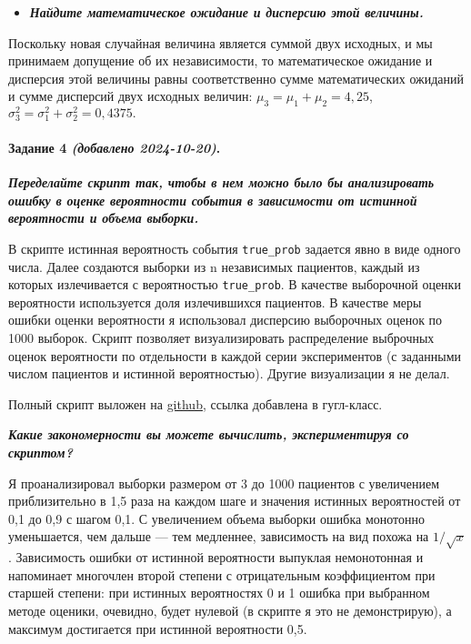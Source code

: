 \documentclass[12pt, a4paper]{article}
\providecommand{\tightlist}{%
  \setlength{\itemsep}{0pt}\setlength{\parskip}{0pt}}
\let\oldparagraph\paragraph
\renewcommand{\paragraph}[1]{\oldparagraph{#1}\mbox{}}
\begin{document}
\begin{itemize}
\tightlist
\item
  \textit{\textbf{Найдите математическое ожидание и дисперсию этой
  величины.}}
\end{itemize}

Поскольку новая случайная величина является суммой двух исходных, и мы принимаем допущение об их независимости, то математическое ожидание и дисперсия этой величины равны соответственно сумме математических ожиданий и сумме дисперсий двух исходных величин: \(\mu_3 = \mu_1+\mu_2 = 4,25\), 
\(\sigma^2_3 = \sigma^2_1 + \sigma^2_2 = 0,4375.\)


\paragraph{Задание 4 \textit{(добавлено 2024-10-20)}.}\label{-4.} 

\textit{\textbf{Переделайте скрипт так, чтобы в нем можно было бы анализировать ошибку в оценке вероятности события в зависимости от истинной вероятности и объема выборки.}}

В скрипте истинная вероятность события \verb|true_prob| задается явно в виде одного числа. Далее создаются выборки из n независимых пациентов, каждый из которых излечивается с вероятностью \verb|true_prob|. В качестве выборочной оценки вероятности используется доля излечившихся пациентов. В качестве меры ошибки оценки вероятности я использовал дисперсию выборочных оценок по 1000 выборок. Скрипт позволяет визуализировать распределение выброчных оценок вероятности по отдельности в каждой серии экспериментов (с заданными числом пациентов и истинной вероятностью). Другие визуализации я не делал.

Полный скрипт выложен на \href{https://github.com/ovtarasov/BioStat_2024/blob/main/ProbStat/Tarasov_Prob_HW2-4.Rmd}{github}, ссылка добавлена в гугл-класс.

\textit{\textbf{Какие закономерности вы можете вычислить, экспериментируя со скриптом?}}

Я проанализировал выборки размером от 3 до 1000 пациентов с увеличением приблизительно в 1,5 раза на каждом шаге и значения истинных вероятностей от 0,1 до 0,9 с шагом 0,1. С увеличением объема выборки ошибка монотонно уменьшается, чем дальше --- тем медленнее, зависимость на вид похожа на $1/\sqrt{x}$. Зависимость ошибки от истинной вероятности выпуклая немонотонная и напоминает многочлен второй степени с отрицательным коэффициентом при старшей степени: при истинных вероятностях 0 и 1 ошибка при выбранном методе оценики, очевидно, будет нулевой (в скрипте я это не демонстрирую), а максимум достигается при истинной вероятности 0,5.
\end{document}
